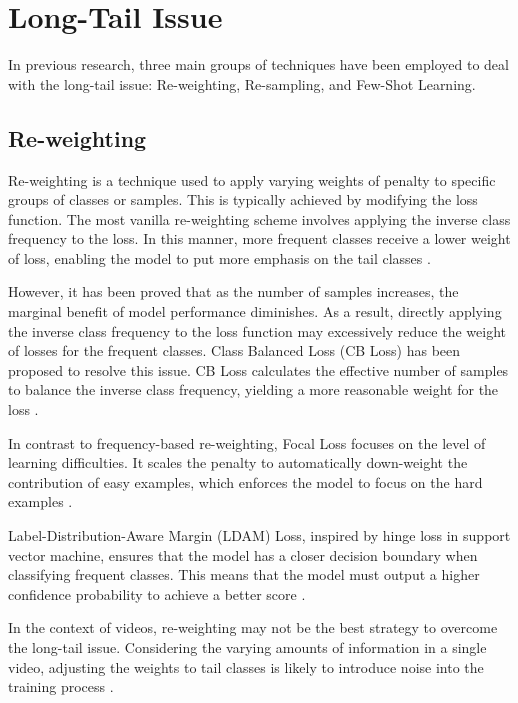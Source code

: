 \section{Long-Tail Issue}
In previous research, three main groups of techniques have been employed to deal with the long-tail issue: Re-weighting, Re-sampling, and Few-Shot Learning.

\subsection{Re-weighting}
Re-weighting is a technique used to apply varying weights of penalty to specific groups of classes or samples. This is typically achieved by modifying the loss function. The most vanilla re-weighting scheme involves applying the inverse class frequency to the loss. In this manner, more frequent classes receive a lower weight of loss, enabling the model to put more emphasis on the tail classes \parencite{khan2017cost, mostajabi2015feedforward}.

However, it has been proved that as the number of samples increases, the marginal benefit of model performance diminishes. As a result, directly applying the inverse class frequency to the loss function may excessively reduce the weight of losses for the frequent classes. Class Balanced Loss (CB Loss) has been proposed to resolve this issue. CB Loss calculates the effective number of samples to balance the inverse class frequency, yielding a more reasonable weight for the loss \parencite{cui2019class}.

In contrast to frequency-based re-weighting, Focal Loss focuses on the level of learning difficulties. It scales the penalty to automatically down-weight the contribution of easy examples, which enforces the model to focus on the hard examples \parencite{lin2017focal}.

Label-Distribution-Aware Margin (LDAM) Loss, inspired by hinge loss in support vector machine, ensures that the model has a closer decision boundary when classifying frequent classes. This means that the model must output a higher confidence probability to achieve a better score \parencite{cao2019learning}.

In the context of videos, re-weighting may not be the best strategy to overcome the long-tail issue. Considering the varying amounts of information in a single video, adjusting the weights to tail classes is likely to introduce noise into the training process \parencite{zhang2021videolt}. 

